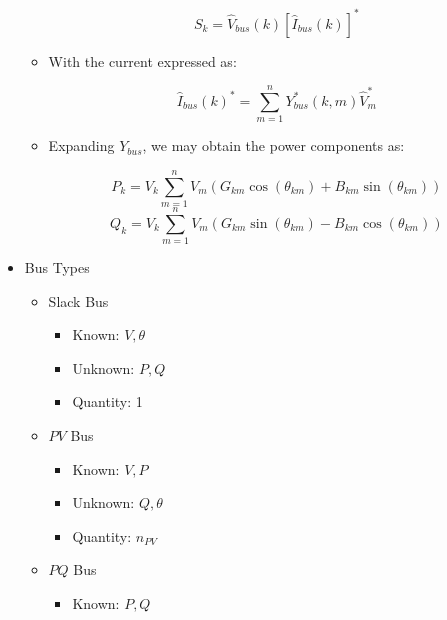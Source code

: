 \begin{itemize}
\begin{itemize}
          $$S_k=\hat{V}_{bus}(k)\left[ \hat{I}_{bus}(k) \right]^{*}$$

        \item With the current expressed as:

          $$\hat{I}_{bus}(k)^* =\sum_{m=1}^nY_{bus}^*(k,m)\hat{V}_m^*$$

        \item Expanding $Y_{bus}$, we may obtain the power components as:

          $$P_k=V_k\sum_{m=1}^nV_m\left( G_{km}\cos(\theta_{km})+B_{km}\sin(\theta_{km}) \right)$$
          $$Q_k=V_k\sum_{m=1}^nV_m\left( G_{km}\sin(\theta_{km})-B_{km}\cos(\theta_{km}) \right)$$

      \end{itemize}

    \item Bus Types

      \begin{itemize}

        \item Slack Bus

          \begin{itemize}

            \item Known: $V,\theta$

            \item Unknown: $P,Q$

            \item Quantity: 1

          \end{itemize}

        \item $PV$ Bus

          \begin{itemize}

            \item Known: $V,P$

            \item Unknown: $Q,\theta$

            \item Quantity: $n_{PV}$

          \end{itemize}

        \item $PQ$ Bus

          \begin{itemize}

            \item Known: $P,Q$


\end{itemize}
\end{itemize}
\end{itemize}
